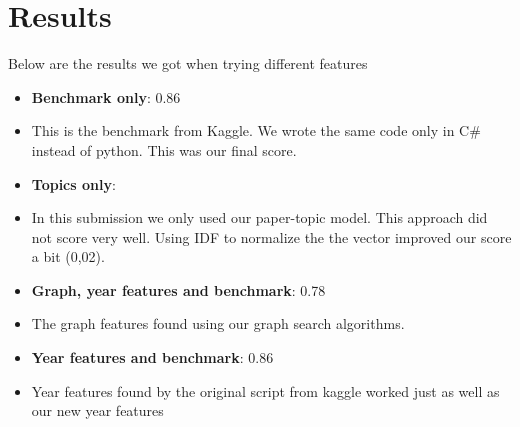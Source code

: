 \section*{Results}

Below are the results we got when trying different features

\begin{itemize}
	\item[] \textbf{Benchmark only}: 0.86
	\item[] This is the benchmark from Kaggle. We wrote the same code only in C\# instead of python. This was our final score.
	\item[] \textbf{Topics only}: 
	\item[] In this submission we only used our paper-topic model. This approach did not score very well. Using IDF to normalize the the vector improved our score a bit (0,02). 
	\item[] \textbf{Graph, year features and benchmark}: 0.78
	\item[] The graph features found using our graph search algorithms.
	\item[] \textbf{Year features and  benchmark}: 0.86
	\item[] Year features found by the original script from kaggle worked just as well as our new year features
\end{itemize}



